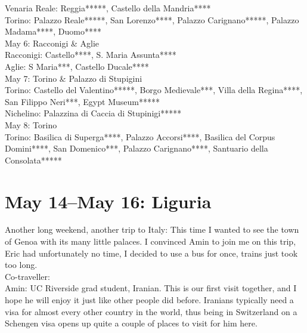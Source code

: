 Venaria Reale: Reggia*****, Castello della Mandria****\\
Torino: Palazzo Reale*****, San Lorenzo****, Palazzo Carignano*****, Palazzo Madama****, Duomo****\\

May 6: Racconigi \& Aglie\\
Racconigi: Castello****, S. Maria Assunta****\\
Aglie: S Maria***, Castello Ducale****\\

May 7: Torino \& Palazzo di Stupigini\\
Torino: Castello del Valentino*****, Borgo Medievale***, Villa della Regina****, San Filippo Neri***, Egypt Museum*****\\
Nichelino: Palazzina di Caccia di Stupinigi*****\\

May 8: Torino\\
Torino: Basilica di Superga****, Palazzo Accorsi****, Basilica del Corpus Domini****, San Domenico***, Palazzo Carignano****, Santuario della Consolata*****

\section{May 14--May 16: Liguria}
\label{2016Liguria}

Another long weekend, another trip to Italy: This time I wanted to see the town of Genoa with its many little palaces. I convinced Amin to join me on this trip, Eric had unfortunately no time, I decided to use a bus for once, trains just took too long. \\

Co-traveller:\\
Amin: UC Riverside grad student, Iranian. This is our first visit together, and I hope he will enjoy it just like other people did before. Iranians typically need a visa for almost every other country in the world, thus being in Switzerland on a Schengen visa opens up quite a couple of places to visit for him here.\\

